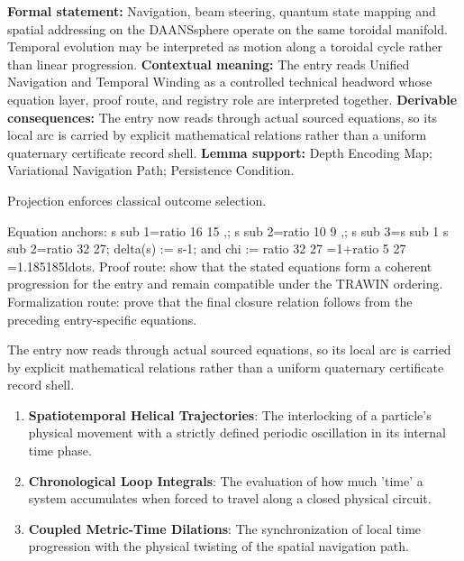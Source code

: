 \begingroup\footnotesize\setlength{\emergencystretch}{3em}\sloppy
\textbf{Formal statement:} Navigation, beam steering, quantum state mapping and spatial addressing on the DAANSsphere operate on the same toroidal manifold. Temporal evolution may be interpreted as motion along a toroidal cycle rather than linear progression. \textbf{Contextual meaning:} The entry reads Unified Navigation and Temporal Winding as a controlled technical headword whose equation layer, proof route, and registry role are interpreted together. \textbf{Derivable consequences:} The entry now reads through actual sourced equations, so its local arc is carried by explicit mathematical relations rather than a uniform quaternary certificate record shell. \textbf{Lemma support:} Depth Encoding Map; Variational Navigation Path; Persistence Condition.\par
\endgroup

Projection enforces classical outcome selection.

Equation anchors: s sub 1=ratio 16 15 ,; s sub 2=ratio 10 9 ,; s sub 3=s sub 1 s sub 2=ratio 32 27; delta(s) := s-1; and chi := ratio 32 27 =1+ratio 5 27 =1.185185ldots. Proof route: show that the stated equations form a coherent progression for the entry and remain compatible under the TRAWIN ordering. Formalization route: prove that the final closure relation follows from the preceding entry-specific equations.

The entry now reads through actual sourced equations, so its local arc is carried by explicit mathematical relations rather than a uniform quaternary certificate record shell.
\endgroup

\begin{enumerate}[leftmargin=1.6em,itemsep=6pt,topsep=4pt]
\item \textbf{Spatiotemporal Helical Trajectories}: The interlocking of a particle's physical movement with a strictly defined periodic oscillation in its internal time phase.
\item \textbf{Chronological Loop Integrals}: The evaluation of how much 'time' a system accumulates when forced to travel along a closed physical circuit.
\item \textbf{Coupled Metric-Time Dilations}: The synchronization of local time progression with the physical twisting of the spatial navigation path.
\end{enumerate}

